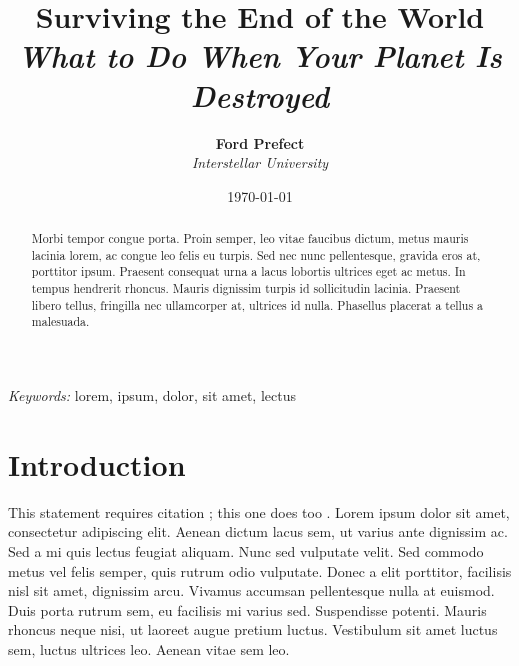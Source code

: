 \documentclass[
  UTF8, %
  12pt, %
]{essay}
\title{
  \textbf{Surviving the End of the World} \\
  {\Large\itshape What to Do When Your Planet Is Destroyed} \\
} %
\author{
  \textbf{Ford Prefect} \\
  \textit{Interstellar University}
} %
\date{\today} %
\begin{document}
\maketitle %



\begin{abstract}
  Morbi tempor congue porta. Proin semper, leo vitae faucibus dictum, metus mauris lacinia lorem, ac congue leo felis eu turpis. Sed nec nunc pellentesque, gravida eros at, porttitor ipsum. Praesent consequat urna a lacus lobortis ultrices eget ac metus. In tempus hendrerit rhoncus. Mauris dignissim turpis id sollicitudin lacinia. Praesent libero tellus, fringilla nec ullamcorper at, ultrices id nulla. Phasellus placerat a tellus a malesuada.
\end{abstract}

\hspace*{3.6mm}\textit{Keywords:} lorem, ipsum, dolor, sit amet, lectus %

\vspace{30pt} %


\section*{Introduction}

This statement requires citation \cite{Smith:2012qr}; this one does too \cite{Smith:2013jd}. Lorem ipsum dolor sit amet, consectetur adipiscing elit. Aenean dictum lacus sem, ut varius ante dignissim ac. Sed a mi quis lectus feugiat aliquam. Nunc sed vulputate velit. Sed commodo metus vel felis semper, quis rutrum odio vulputate. Donec a elit porttitor, facilisis nisl sit amet, dignissim arcu. Vivamus accumsan pellentesque nulla at euismod. Duis porta rutrum sem, eu facilisis mi varius sed. Suspendisse potenti. Mauris rhoncus neque nisi, ut laoreet augue pretium luctus. Vestibulum sit amet luctus sem, luctus ultrices leo. Aenean vitae sem leo.
\end{document}
